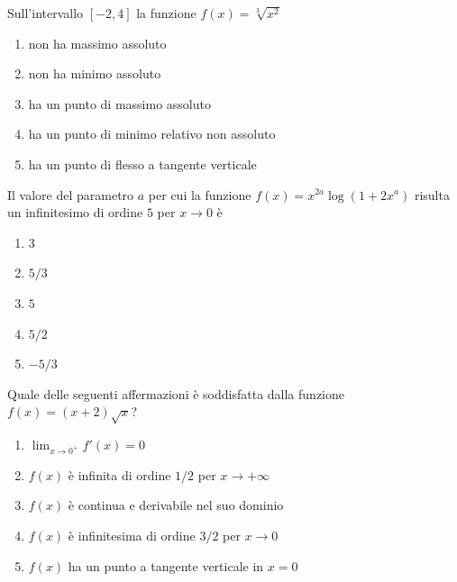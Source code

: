 \begin{quiz}
Sull'intervallo $[-2,4]$ la funzione $f(x)=\sqrt[3]{x^2}$
\begin{enumerate}
\item non ha massimo assoluto
\item non ha minimo assoluto
\item ha un punto di massimo assoluto
\item ha un punto di minimo relativo non assoluto
\item ha un punto di flesso a tangente verticale
\end{enumerate}
\end{quiz}

\begin{quiz}
Il valore del parametro $a$ per cui la funzione $f(x)=x^{2a}\log(1+2x^a)$ risulta un infinitesimo di ordine $5$ per $x\to0$ \`e
\begin{enumerate}
\item $3$
\item $5/3$
\item $5$
\item $5/2$
\item $-5/3$
\end{enumerate}
\end{quiz}

\begin{quiz}
Quale delle seguenti affermazioni \`e soddisfatta dalla funzione $f(x)=(x+2)\sqrt{x}$?
\begin{enumerate}
\item $\lim_{x\to0^+}f'(x)=0$
\item $f(x)$ \`e infinita di ordine $1/2$ per $x\to+\infty$
\item $f(x)$ \`e continua e derivabile nel suo dominio
\item $f(x)$ \`e infinitesima di ordine $3/2$ per $x\to0$
\item $f(x)$ ha un punto a tangente verticale in $x=0$
\end{enumerate}
\end{quiz}

